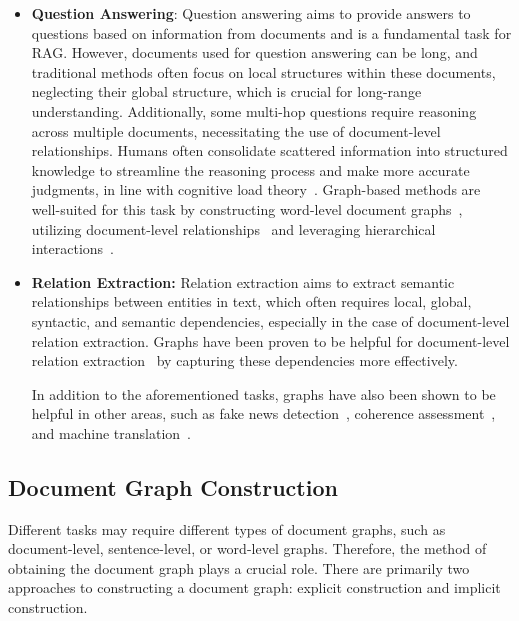 \begin{itemize}[leftmargin=*]
\item \textbf{Question Answering}: Question answering aims to provide answers to questions based on information from documents and is a fundamental task for RAG. However, documents used for question answering can be long, and traditional methods often focus on local structures within these documents, neglecting their global structure, which is crucial for long-range understanding. Additionally, some multi-hop questions require reasoning across multiple documents, necessitating the use of document-level relationships.  Humans often consolidate scattered information into structured knowledge to streamline the reasoning process and make more accurate judgments, in line with cognitive load theory~\citep{sweller1988cognitive, li2024structrag}. Graph-based methods are well-suited for this task by constructing word-level document graphs~\citep{nie2022capturing, wang2023docgraphlm}, utilizing document-level relationships~\citep{he2024g, wang2024knowledge} and leveraging hierarchical interactions~\citep{fang2019hierarchical}.


\item \textbf{Relation Extraction:} Relation extraction aims to extract semantic relationships between entities in text, which often requires local, global, syntactic, and semantic dependencies, especially in the case of document-level relation extraction. Graphs have been proven to be helpful for document-level relation extraction~\citep{wang2020global, nan2020reasoning, sahu2019inter, christopoulou2019connecting, zhou2020global} by capturing these dependencies more effectively.

In addition to the aforementioned tasks, graphs have also been shown to be helpful in other areas, such as fake news detection~\citep{hu2021compare}, coherence assessment~\citep{liu2023modeling}, and machine translation~\citep{xu2020document}.
\end{itemize}


\subsection{Document Graph Construction}

Different tasks may require different types of document graphs, such as document-level, sentence-level, or word-level graphs. Therefore, the method of obtaining the document graph plays a crucial role. There are primarily two approaches to constructing a document graph: explicit construction and implicit construction.


